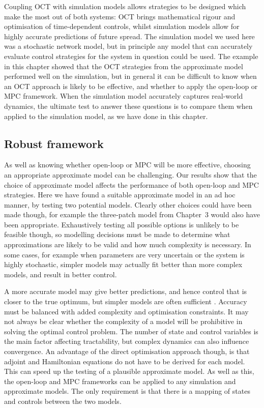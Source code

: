 Coupling OCT with simulation models allows strategies to be designed which make the most out of both systems: OCT brings mathematical rigour and optimisation of time-dependent controls, whilst simulation models allow for highly accurate predictions of future spread. The simulation model we used here was a stochastic network model, but in principle any model that can accurately evaluate control strategies for the system in question could be used. The example in this chapter showed that the OCT strategies from the approximate model performed well on the simulation, but in general it can be difficult to know when an OCT approach is likely to be effective, and whether to apply the open-loop or MPC framework. When the simulation model accurately captures real-world dynamics, the ultimate test to answer these questions is to compare them when applied to the simulation model, as we have done in this chapter.

\subsection{Robust framework}

As well as knowing whether open-loop or MPC will be more effective, choosing an appropriate approximate model can be challenging. Our results show that the choice of approximate model affects the performance of both open-loop and MPC strategies. Here we have found a suitable approximate model in an ad hoc manner, by testing two potential models. Clearly other choices could have been made though, for example the three-patch model from Chapter~3 would also have been appropriate. Exhaustively testing all possible options is unlikely to be feasible though, so modelling decisions must be made to determine what approximations are likely to be valid and how much complexity is necessary. In some cases, for example when parameters are very uncertain or the system is highly stochastic, simpler models may actually fit better than more complex models, and result in better control.

A more accurate model may give better predictions, and hence control that is closer to the true optimum, but simpler models are often sufficient \citep{thompson_effect_2018}. Accuracy must be balanced with added complexity and optimisation constraints. It may not always be clear whether the complexity of a model will be prohibitive in solving the optimal control problem. The number of state and control variables is the main factor affecting tractability, but complex dynamics can also influence convergence. An advantage of the direct optimisation approach though, is that adjoint and Hamiltonian equations do not have to be derived for each model. This can speed up the testing of a plausible approximate model. As well as this, the open-loop and MPC frameworks can be applied to any simulation and approximate models. The only requirement is that there is a mapping of states and controls between the two models. 

